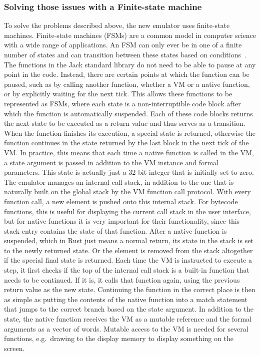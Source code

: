 
\subsubsection{Solving those issues with a Finite-state machine}
To solve the problems described above, the new emulator uses finite-state machines.
Finite-state machines (FSMs) are a common model in computer science with a wide range of applications. An FSM can only ever be in one of a finite number of states and can transition between these states based on conditions~\cite{sakarovitch2009elements}.
The functions in the Jack standard library do not need to be able to pause at any point in the code. Instead, there are certain points at which the function can be paused, such as by calling another function, whether a VM or a native function, or by explicitly waiting for the next tick.
This allows these functions to be represented as FSMs, where each state is a non-interruptible code block after which the function is automatically suspended. Each of these code blocks returns the next state to be executed as a return value and thus serves as a transition.
When the function finishes its execution, a special state is returned, otherwise the function continues in the state returned by the last block in the next tick of the VM.
In practice, this means that each time a native function is called in the VM, a state argument is passed in addition to the VM instance and formal parameters.
This state is actually just a 32-bit integer that is initially set to zero.
The emulator manages an internal call stack, in addition to the one that is naturally built on the global stack by the VM function call protocol.
With every function call, a new element is pushed onto this internal stack. For bytecode functions, this is useful for displaying the current call stack in the user interface, but for native functions it is very important for their functionality, since this stack entry contains the state of that function.
After a native function is suspended, which in Rust just means a normal return, its state in the stack is set to the newly returned state. Or the element is removed from the stack altogether if the special final state is returned.
Each time the VM is instructed to execute a step, it first checks if the top of the internal call stack is a built-in function that needs to be continued. If it is, it calls that function again, using the previous return value as the new state.
Continuing the function in the correct place is then as simple as putting the contents of the native function into a match statement that jumps to the correct branch based on the state argument.
In addition to the state, the native function receives the VM as a mutable reference and the formal arguments as a vector of words.
Mutable access to the VM is needed for several functions, e.g.\ drawing to the display memory to display something on the screen.

